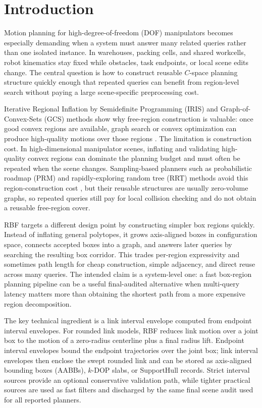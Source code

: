 \documentclass[journal]{IEEEtran}
\DeclareRobustCommand{\textsc}[1]{\textnormal{\MakeUppercase{#1}}}
\newcommand{\rbf}{\textsc{RBF}}
\begin{document}
\section{Introduction}\label{sec:intro}

Motion planning for high-degree-of-freedom (DOF) manipulators becomes
especially demanding when a system must answer many related queries rather than
one isolated instance. In warehouses, packing cells, and shared workcells,
robot kinematics stay fixed while obstacles, task endpoints, or local scene
edits change. The central question is how to construct reusable $C$-space
planning structure quickly enough that repeated queries can benefit from
region-level search without paying a large scene-specific preprocessing cost.

Iterative Regional Inflation by Semidefinite Programming (IRIS) and
Graph-of-Convex-Sets (GCS) methods show why free-region construction is
valuable: once good convex regions are available, graph search or convex
optimization can produce high-quality motions over those regions
\cite{deits2015computing,marcucci2023motion,marcucci2024shortest}. The
limitation is construction cost. In high-dimensional manipulator scenes,
inflating and validating high-quality convex regions can dominate the planning
budget and must often be repeated when the scene changes. Sampling-based planners such as probabilistic roadmap (PRM) and
rapidly-exploring random tree (RRT) methods avoid this region-construction cost
\cite{lavalle2006planning,lavalle1998rapidly,kavraki1996probabilistic,
karaman2011sampling}, but their reusable structures are usually zero-volume
graphs, so repeated queries still pay for local collision checking and do not
obtain a reusable free-region cover.

\rbf{} targets a different design point by constructing simpler box regions
quickly.
Instead of inflating general polytopes, it grows axis-aligned boxes in
configuration space, connects accepted boxes into a graph, and answers later
queries by searching the resulting box corridor. This trades per-region
expressivity and sometimes path length for cheap construction, simple
adjacency, and direct reuse across many queries. The intended claim is a
system-level one: a fast box-region planning pipeline can be a useful
final-audited alternative when multi-query latency matters more than obtaining
the shortest path from a more expensive region decomposition.

The key technical ingredient is a link interval envelope computed from endpoint
interval envelopes. For rounded link models, \rbf{} reduces link motion over a
joint box to the motion of a zero-radius centerline plus a final radius lift.
Endpoint interval envelopes bound the endpoint trajectories over the joint box;
link interval envelopes then enclose the swept rounded link and can be stored as
axis-aligned bounding boxes (AABBs), $k$-DOP slabs, or SupportHull records. Strict interval sources provide an
optional conservative validation path, while tighter practical sources are used
as fast filters and discharged by the same final scene audit used for all
reported planners.
\end{document}
